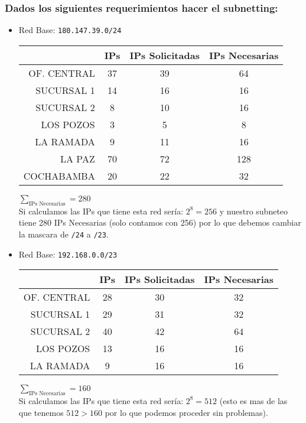 \subsubsection*{Dados los siguientes requerimientos hacer el subnetting:}

\begin{itemize}
\item Red Base: \texttt{180.147.39.0/24}

\begin{table}[ht]
    \begin{tabular}{|r|c|c|c|}
        \hline
        ~           & IPs & IPs Solicitadas & IPs Necesarias \\ \hline
        OF. CENTRAL & 37  & 39              & 64             \\ 
        SUCURSAL 1  & 14  & 16              & 16             \\ 
        SUCURSAL 2  & 8   & 10              & 16             \\ 
        LOS POZOS   & 3   & 5               & 8              \\ 
        LA RAMADA   & 9   & 11              & 16             \\ 
        LA PAZ      & 70  & 72              & 128            \\ 
        COCHABAMBA  & 20  & 22              & 32             \\
        \hline
    \end{tabular}
\end{table}
$\sum_{\text{IPs Necesarias}}=280$ \\
Si calculamos las IPs que tiene esta red sería: $2^8=256$ y nuestro subneteo tiene 280 IPs Necesarias (solo contamos con 256) por lo que debemos cambiar la mascara de \texttt{/24} a \texttt{/23}.



\item Red Base: \texttt{192.168.0.0/23}

\begin{table}[ht]
    \begin{tabular}{|r|c|c|c|}
        \hline
        ~           & IPs & IPs Solicitadas & IPs Necesarias \\ \hline
        OF. CENTRAL & 28  & 30              & 32             \\ 
        SUCURSAL 1  & 29  & 31              & 32             \\ 
        SUCURSAL 2  & 40   & 42              & 64             \\ 
        LOS POZOS   & 13   & 16               & 16              \\ 
        LA RAMADA   & 9   & 16              & 16   
\\
        \hline
    \end{tabular}
\end{table}
$\sum_{\text{IPs Necesarias}}=160$\\
Si calculamos las IPs que tiene esta red sería: $2^8=512$ (esto es mas de las que tenemos $512>160$ por lo que podemos proceder sin problemas).
\begin{center}


\end{center}
\end{itemize}
